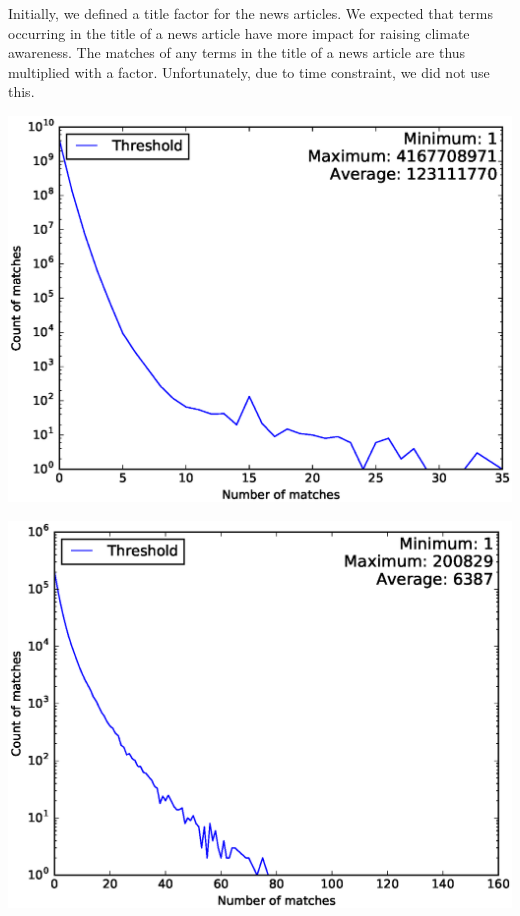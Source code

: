 \documentclass[paper=a4, fontsize=9px]{scrartcl} %
\numberwithin{equation}{section} %
\numberwithin{figure}{section} %
\numberwithin{table}{section} %
\newenvironment{Figure}
{\par\medskip\noindent\minipage{\linewidth}}
{\endminipage\par\medskip}
\begin{document}
\begin{multicols}{2}
Initially, we defined a title factor for the news articles. We expected that terms occurring in the title of a news article have more impact for raising climate awareness. The matches of any terms in the title of a news article are thus multiplied with a factor. Unfortunately, due to time constraint, we did not use this.

\begin{Figure}
	\includegraphics[width=\textwidth]{img/threshold_twitter_log_scale}
	\label{fig:1}
\end{Figure}

\begin{Figure}
	\includegraphics[width=\textwidth]{img/threshold_volkskrant_log_scale}
	\label{fig:2}
\end{Figure}


\end{multicols}
\end{document}
